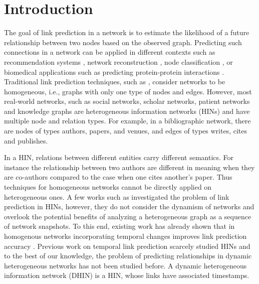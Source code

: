 \section{Introduction}
\label{Sec:Introduction}


The goal of link prediction in a network \cite{liben2007link} is to estimate the likelihood of a future relationship between two nodes based on the observed graph. Predicting such connections in a network %
can be applied in different contexts such as recommendation systems 
\cite{chen2005link,song2009scalable,lu2012recommender,li2013recommendation,guy2015social}, network reconstruction \cite{guimera2009missing}, node classification \cite{gallagher2008using}, or biomedical applications such as predicting protein-protein interactions \cite{lei2012novel}. Traditional link prediction techniques, such as \cite{liben2007link}, consider networks to be homogeneous, i.e., graphs with only one type of nodes and edges. However, most real-world networks, such as social networks, scholar networks, patient networks \cite{denny2012mining} and knowledge graphs \cite{wang2015incorporating} are heterogeneous information networks (HINs) \cite{shi2017survey} and have multiple node and relation types. For example, in a bibliographic network, there are nodes of types authors, papers, and venues, and edges of types writes, cites and publishes.

In a HIN, relations between different entities carry different semantics. For instance the relationship between two authors are different in meaning when they are co-authors compared to the case when one cites another's paper. Thus techniques for homogeneous networks \cite{liben2007link,wang2007local,lichtenwalter2010new,leroy2010cold,al2006link} cannot be directly applied on heterogeneous ones. A few works such as \cite{sun2011pathsim,sun2011ASONAM} investigated the problem of link prediction in HINs, however, they do not consider the dynamism of networks and overlook the potential benefits of analyzing a heterogeneous graph as a sequence of network snapshots. To this end, existing work has already shown that in homogenous networks incorporating temporal changes improves link prediction accuracy \cite{Zhu2016}. Previous work on temporal link prediction scarcely studied HINs and to the best of our knowledge, the problem of predicting relationships in dynamic heterogeneous networks has not been studied before. A dynamic heterogeneous information network (DHIN) is a HIN, whose links have associated timestamps.

